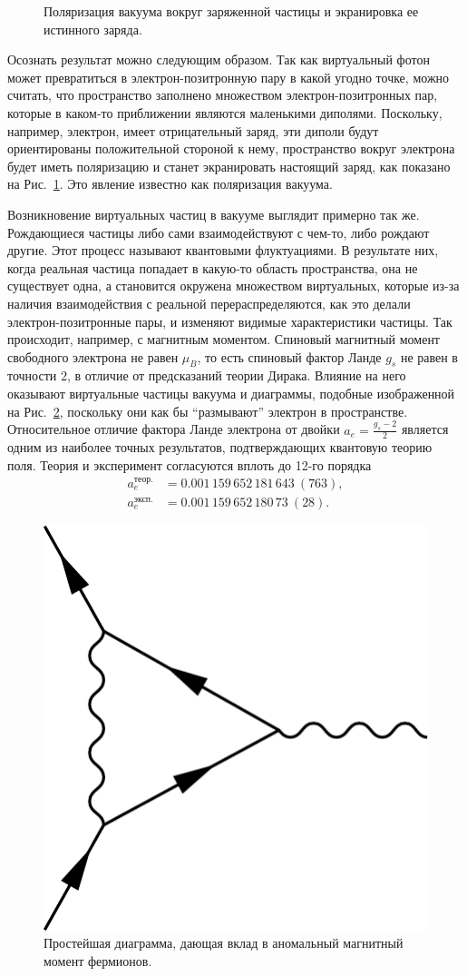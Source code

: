 \begin{figure}
\def\svgwidth{.5\linewidth}

\caption{Поляризация вакуума вокруг заряженной частицы и экранировка ее истинного заряда.}
\label{fig:VacPol}
\end{figure}

Осознать результат можно следующим образом. 
Так как виртуальный фотон может превратиться в электрон-позитронную пару в какой угодно точке, можно считать, что пространство заполнено множеством электрон-позитронных пар, которые в каком-то приближении являются маленькими диполями. 
Поскольку, например, электрон, имеет отрицательный заряд, эти диполи будут ориентированы положительной стороной к нему, пространство вокруг электрона будет иметь поляризацию и станет экранировать настоящий заряд, как показано на Рис.~\ref{fig:VacPol}. 
Это явление известно как поляризация вакуума. 

Возникновение виртуальных частиц в вакууме выглядит примерно так же. 
Рождающиеся частицы либо сами взаимодействуют с чем-то, либо рождают другие. 
Этот процесс называют квантовыми флуктуациями. 
В результате них, когда реальная частица попадает в какую-то область пространства, она не существует одна, а становится окружена множеством виртуальных, которые из-за наличия взаимодействия с реальной перераспределяются, как это делали электрон-позитронные пары, и изменяют видимые характеристики частицы. 
Так происходит, например, с магнитным моментом. 
Спиновый магнитный момент свободного электрона не равен $\mu_B$, то есть спиновый фактор Ланде $g_s$ не равен в точности $2$, в отличие от предсказаний теории Дирака. Влияние на него оказывают виртуальные частицы вакуума и диаграммы, подобные изображенной на Рис.~\ref{fig:g_s}, поскольку они как бы ``размывают'' электрон в пространстве. 
Относительное отличие фактора Ланде электрона от двойки $a_e = \frac{g_s - 2}{2}$ является одним из наиболее точных результатов, подтверждающих квантовую теорию поля. 
Теория и эксперимент согласуются вплоть до 12-го порядка~\cite{electron.g-2.exp, electron.g-2.theory}
\begin{align*}
a_e^\text{теор.} &= 0.001\,159\,652\,181\,643\ (763), \\
a_e^\text{эксп.} &= 0.001\,159\,652\,180\,73\ (28). 
\end{align*}

\begin{figure}
\includegraphics[width=.25\linewidth]{figs/Magnetic-anom-e}
\caption{Простейшая диаграмма, дающая вклад в аномальный магнитный момент фермионов.}
\label{fig:g_s}
\end{figure}

